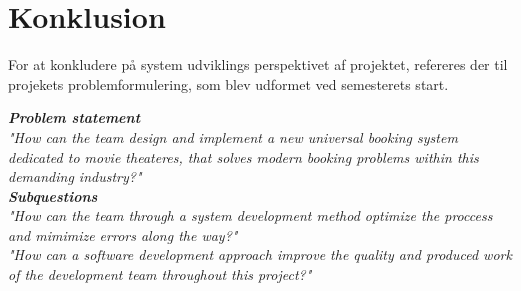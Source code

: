 \chapter{Konklusion}\label{ch:konklusion}
For at konkludere på system udviklings perspektivet af projektet, refereres der til projekets problemformulering,
som blev udformet ved semesterets start.

\begin{center}
\textit{\textbf{Problem statement} \\
"How can the team design and implement a new universal booking system dedicated to movie theateres, 
that solves modern booking problems within this demanding industry?"} \\

\textit{\textbf{Subquestions}\\
"How can the team through a system development method optimize the proccess and mimimize errors along the way?"}\\

\textit{"How can a software development approach improve the quality and 
produced work of the development team throughout this project?"}\\
\end{center} 





